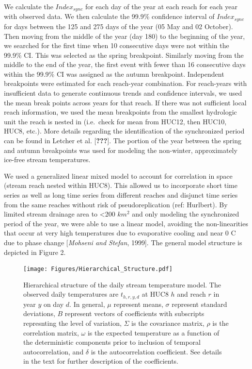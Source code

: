 We calculate the \(Index_{sync}\) for each day of the year at each reach
for each year with observed data. We then calculate the 99.9\%
confidence interval of \(Index_{sync}\) for days between the 125 and 275
days of the year (05 May and 02 October). Then moving from the middle of
the year (day 180) to the beginning of the year, we searched for the
first time when 10 consecutive days were not within the 99.9\% CI. This
was selected as the spring breakpoint. Similarly moving from the middle
to the end of the year, the first event with fewer than 16 consecutive
days within the 99.9\% CI was assigned as the autumn breakpoint.
Independent breakpoints were estimated for each reach-year combination.
For reach-years with insufficient data to generate continuous trends and
confidence intervals, we used the mean break points across years for
that reach. If there was not sufficient local reach information, we used
the mean breakpoints from the smallest hydrologic unit the reach is
nested in (i.e.~check for mean from HUC12, then HUC10, HUC8, etc.). More
details regarding the identification of the synchronized period can be
found in Letcher et al. {[}{\textbf{???}}{]}. The portion of the year
between the spring and autumn breakpoints was used for modeling the
non-winter, approximately ice-free stream temperatures.

We used a generalized linear mixed model to account for correlation in
space (stream reach nested within HUC8). This allowed us to incorporate
short time series as well as long time series from different reaches and
disjunct time series from the same reaches without risk of
pseudoreplication (ref: Hurlbert). By limited stream drainage area to
\textless{}200 \(km^2\) and only modeling the synchronized period of the
year, we were able to use a linear model, avoiding the non-linearities
that occur at very high temperatures due to evaporative cooling and near
0 C due to phase change {[}\emph{Mohseni and Stefan}, 1999{]}. The
general model structure is depicted in Figure 2.

\begin{figure}[htbp]
\centering
\texttt{[image: Figures/Hierarchical\_Structure.pdf]}
\caption{Hierarchical structure of the daily stream temperature model.
The observed daily temperatures are \(t_{h,r,y,d}\) at HUC8 \(h\) and
reach \(r\) in year \(y\) on day \(d\). In general, \(\mu\) represent
means, \(\sigma\) represent standard deviations, \(B\) represent vectors
of coefficients with subscripts represnting the level of variation,
\(\Sigma\) is the covariance matrix, \(\rho\) is the correlation matrix,
\(\omega\) is the expected temperature as a function of the
deterministic components prior to inclusion of temporal autocorrelation,
and \(\delta\) is the autocorrelation coefficient. See details in the
text for further description of the coefficients.}
\end{figure}

